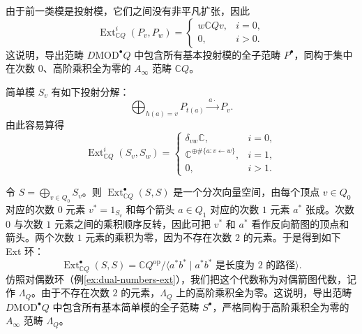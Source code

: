 由于前一类模是投射模，它们之间没有非平凡扩张，因此
\[
  \operatorname{Ext}^i_{\mathbb C Q}(P_v,P_w)
  =\begin{cases}
    w\mathbb C Qv,&i=0,\\
    0,&i>0.
  \end{cases}
\]
这说明，导出范畴 $D\mathrm{MOD}^\bullet Q$ 中包含所有基本投射模的全子范畴 $P^\bullet$，同构于集中在次数 $0$、高阶乘积全为零的 $A_\infty$ 范畴 $\mathbb C Q$。

简单模 $S_v$ 有如下投射分解：
\[
  \bigoplus_{h(a)=v}P_{t(a)}\xrightarrow{\,a\cdot\,}P_v.
\]
由此容易算得
\[
  \operatorname{Ext}^i_{\mathbb C Q}(S_v,S_w)=
  \begin{cases}
    \delta_{vw}\mathbb C,&i=0,\\
    \mathbb C^{\oplus\#\{a:v\leftarrow w\}},&i=1,\\
    0,&i>1.
  \end{cases}
\]

令 $S=\bigoplus_{v\in Q_0}S_v$。则 $\operatorname{Ext}^\bullet_{\mathbb C Q}(S,S)$ 是一个分次向量空间，由每个顶点 $v\in Q_0$ 对应的次数 $0$ 元素 $v^*=1_{S_v}$ 和每个箭头 $a\in Q_1$ 对应的次数 $1$ 元素 $a^*$ 张成。次数 $0$ 与次数 $1$ 元素之间的乘积顺序反转，因此可把 $v^*$ 和 $a^*$ 看作反向箭图的顶点和箭头。两个次数 $1$ 元素的乘积为零，因为不存在次数 $2$ 的元素。于是得到如下 Ext 环：
\[
  \operatorname{Ext}^\bullet_{\mathbb C Q}(S,S)
  =\mathbb C Q^{\mathrm{op}}/\langle a^*b^*\mid a^*b^*\text{ 是长度为 }2\text{ 的路径}\rangle.
\]
仿照对偶数环（例\ref{ex:dual-numbers-ext}），我们把这个代数称为对偶箭图代数，记作 $\Lambda_Q$。由于不存在次数 $2$ 的元素，$\Lambda_Q$ 上的高阶乘积全为零。这说明，导出范畴 $D\mathrm{MOD}^\bullet Q$ 中包含所有基本简单模的全子范畴 $S^\bullet$，严格同构于高阶乘积全为零的 $A_\infty$ 范畴 $\Lambda_Q$。

